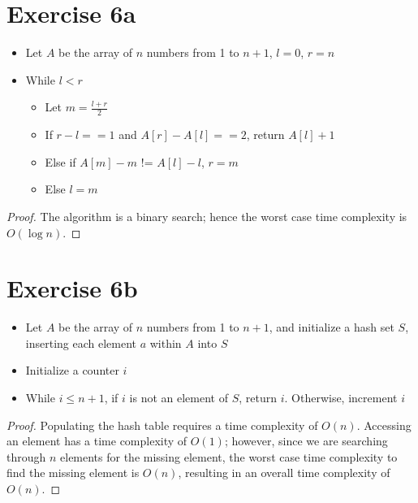 \documentclass[11pt]{article}
\begin{document}
\section*{Exercise 6a}
\begin{itemize}
\item Let $A$ be the array of $n$ numbers from 1 to $n+1$, $l=0$, $r=n$
\item While $l<r$
\begin{itemize}
\item Let $m=\frac{l+r}{2}$
\item If $r-l == 1$ and $A[r]-A[l]==2$, return $A[l]+1$
\item Else if $A[m]-m$ != $A[l]-l$, $r=m$
\item Else $l=m$
\end{itemize}
\end{itemize}
\begin{proof}
The algorithm is a binary search; hence the worst case time complexity is $O(\log n)$.
\end{proof}

\section*{Exercise 6b}
\begin{itemize}
\item Let $A$ be the array of $n$ numbers from 1 to $n+1$, and initialize a hash set $S$, inserting each element $a$ within $A$ into $S$
\item Initialize a counter $i$
\item While $i \leq n+1$, if $i$ is not an element of $S$, return $i$. Otherwise, increment $i$
\end{itemize}
\begin{proof}
Populating the hash table requires a time complexity of $O(n)$. Accessing an element has a time complexity of $O(1)$; however, since we are searching through $n$ elements for the missing element, the worst case time complexity to find the missing element is $O(n)$, resulting in an overall time complexity of $O(n)$.
\end{proof}
\end{document}
